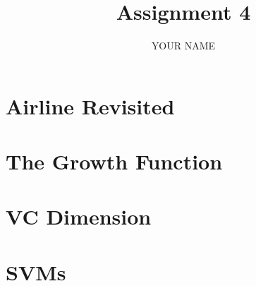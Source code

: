 \documentclass[a4paper]{article}
\title{\vspace{-5cm} Assignment 4}
\author{YOUR NAME}
\begin{document}
\maketitle

\tableofcontents

\section{Airline Revisited}

\section{The Growth Function}

\section{VC Dimension}

\section{SVMs}
\end{document}
